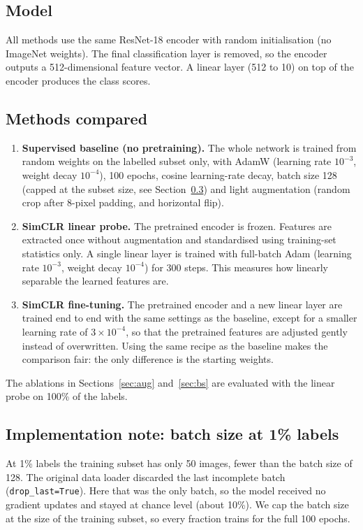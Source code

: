 \documentclass[11pt,a4paper]{article}
\begin{document}
\subsection{Model}
All methods use the same ResNet-18 encoder with random initialisation (no ImageNet weights). The final
classification layer is removed, so the encoder outputs a 512-dimensional feature vector. A linear layer
(512 to 10) on top of the encoder produces the class scores.

\subsection{Methods compared}
\begin{enumerate}
  \item \textbf{Supervised baseline (no pretraining).} The whole network is trained from random weights on the
  labelled subset only, with AdamW (learning rate $10^{-3}$, weight decay $10^{-4}$), 100 epochs, cosine
  learning-rate decay, batch size 128 (capped at the subset size, see Section~\ref{sec:droplast}) and light
  augmentation (random crop after 8-pixel padding, and horizontal flip).
  \item \textbf{SimCLR linear probe.} The pretrained encoder is frozen. Features are extracted once without
  augmentation and standardised using training-set statistics only. A single linear layer is trained with
  full-batch Adam (learning rate $10^{-3}$, weight decay $10^{-4}$) for 300 steps. This measures how linearly
  separable the learned features are.
  \item \textbf{SimCLR fine-tuning.} The pretrained encoder and a new linear layer are trained end to end with
  the same settings as the baseline, except for a smaller learning rate of $3\times10^{-4}$, so that the
  pretrained features are adjusted gently instead of overwritten. Using the same recipe as the baseline makes
  the comparison fair: the only difference is the starting weights.
\end{enumerate}
The ablations in Sections~\ref{sec:aug} and~\ref{sec:bs} are evaluated with the linear probe on 100\% of the
labels.

\subsection{Implementation note: batch size at 1\% labels}\label{sec:droplast}
At 1\% labels the training subset has only 50 images, fewer than the batch size of 128. The original data
loader discarded the last incomplete batch (\texttt{drop\_last=True}). Here that was the only batch, so the
model received no gradient updates and stayed at chance level (about 10\%). We cap the batch size at the size
of the training subset, so every fraction trains for the full 100 epochs.
\end{document}
